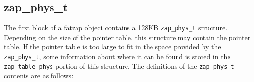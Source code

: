 \subsection{zap\_phys\_t}

The first block of a fatzap object contains a 128KB \lstinline{zap_phys_t} structure.
Depending on the size of the pointer table,
this structure may contain the pointer table.
If the pointer table is too large to fit in the space provided by the \lstinline{zap_phys_t},
some information about where it can be found
is stored in the \lstinline{zap_table_phys} portion of this structure.
The definitions of the \lstinline{zap_phys_t} contents are as follows:
